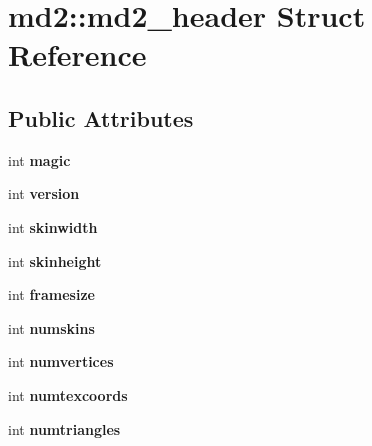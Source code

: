 \hypertarget{structmd2_1_1md2__header}{}\section{md2\+:\+:md2\+\_\+header Struct Reference}
\label{structmd2_1_1md2__header}
\subsection*{Public Attributes}
\begin{DoxyCompactItemize}
\item 
\mbox{\label{structmd2_1_1md2__header_a04bc0b9b5d1d0d988fd1573d5c9ce5cc}} 
int {\bfseries magic}
\item 
\mbox{\label{structmd2_1_1md2__header_a666c21363c610a475e576f3b02742799}} 
int {\bfseries version}
\item 
\mbox{\label{structmd2_1_1md2__header_a18a65c4f76f4a2253d544b4916c24470}} 
int {\bfseries skinwidth}
\item 
\mbox{\label{structmd2_1_1md2__header_a688530ab7d98d958c278dc6b0f62f908}} 
int {\bfseries skinheight}
\item 
\mbox{\label{structmd2_1_1md2__header_a831fb9bfd825398ce4303092a8d25c04}} 
int {\bfseries framesize}
\item 
\mbox{\label{structmd2_1_1md2__header_a253a8421fd28f0b8ed07712d90dd3d3c}} 
int {\bfseries numskins}
\item 
\mbox{\label{structmd2_1_1md2__header_a1095045641f24b2bf219674dd47ff37e}} 
int {\bfseries numvertices}
\item 
\mbox{\label{structmd2_1_1md2__header_aab98593be1fa6e9dc5fe8c108f8e9115}} 
int {\bfseries numtexcoords}
\item 
\mbox{\label{structmd2_1_1md2__header_a9ef837e686d06839186e934a2386724b}} 
int {\bfseries numtriangles}
\item 

\end{DoxyCompactItemize}
